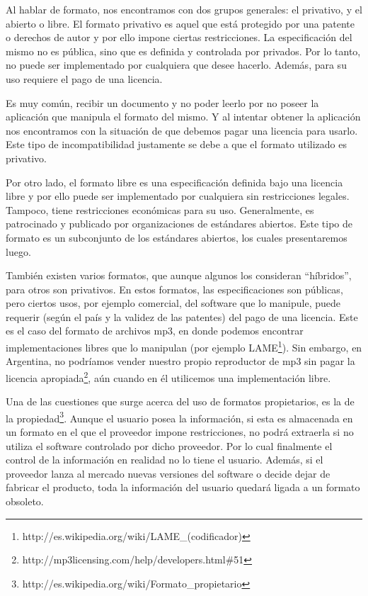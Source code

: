 \documentclass[12pt]{article}
\begin{document}
Al hablar de formato, nos encontramos con dos grupos generales: el privativo, y el abierto o libre. El formato privativo es aquel que está protegido por una patente o derechos de autor y por ello impone ciertas restricciones. La especificación del mismo no es pública, sino que es definida y controlada por privados. Por lo tanto, no puede ser implementado por cualquiera que desee hacerlo. Además, para su uso requiere el pago de una licencia.

Es muy común, recibir un documento y no poder leerlo por no poseer la aplicación que manipula el formato del mismo. Y al intentar obtener la aplicación nos encontramos con la situación de que debemos pagar una licencia para usarlo. Este tipo de incompatibilidad justamente se debe a que el formato utilizado es privativo. 

Por otro lado, el formato libre es una especificación definida bajo una licencia libre y por ello puede ser implementado por cualquiera sin restricciones legales. Tampoco, tiene restricciones económicas para su uso. Generalmente, es patrocinado y publicado por organizaciones de estándares abiertos. Este tipo de formato es un subconjunto de los estándares abiertos, los cuales presentaremos luego.

También existen varios formatos, que aunque algunos los consideran “híbridos”, para otros son privativos. En estos formatos, las especificaciones son públicas, pero ciertos usos, por ejemplo comercial, del software que lo manipule, puede requerir (según el país y la validez de las patentes) del pago de una licencia. Este es el caso del formato de archivos mp3, en donde podemos encontrar implementaciones libres que lo manipulan (por ejemplo LAME\footnote{http://es.wikipedia.org/wiki/LAME_(codificador)}). Sin embargo, en Argentina, no podríamos vender nuestro propio reproductor de mp3 sin pagar la licencia apropiada\footnote{http://mp3licensing.com/help/developers.html\#51}, aún cuando en él utilicemos una implementación libre. 

Una de las cuestiones que surge acerca del uso de formatos propietarios, es la de la propiedad\footnote{http://es.wikipedia.org/wiki/Formato\_propietario}. Aunque el usuario posea la información, si esta es almacenada en un formato en el que el proveedor impone restricciones, no podrá extraerla si no utiliza el software controlado por dicho proveedor. Por lo cual finalmente el control de la información en realidad no lo tiene el usuario. Además, si el proveedor lanza al mercado nuevas versiones del software o decide dejar de fabricar el producto, toda la información del usuario quedará ligada a un formato obsoleto.  
\end{document}
